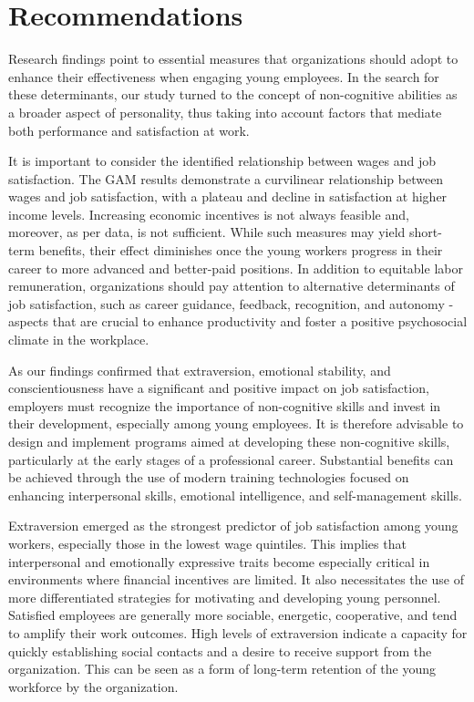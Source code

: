 \documentclass[
]{interact}
\begin{document}
\section{Recommendations}\label{recommendations}

Research findings point to essential measures that organizations should
adopt to enhance their effectiveness when engaging young employees. In
the search for these determinants, our study turned to the concept of
non-cognitive abilities as a broader aspect of personality, thus taking
into account factors that mediate both performance and satisfaction at
work.

It is important to consider the identified relationship between wages
and job satisfaction. The GAM results demonstrate a curvilinear
relationship between wages and job satisfaction, with a plateau and
decline in satisfaction at higher income levels. Increasing economic
incentives is not always feasible and, moreover, as per data, is not
sufficient. While such measures may yield short-term benefits, their
effect diminishes once the young workers progress in their career to
more advanced and better-paid positions. In addition to equitable labor
remuneration, organizations should pay attention to alternative
determinants of job satisfaction, such as career guidance, feedback,
recognition, and autonomy - aspects that are crucial to enhance
productivity and foster a positive psychosocial climate in the
workplace.

As our findings confirmed that extraversion, emotional stability, and
conscientiousness have a significant and positive impact on job
satisfaction, employers must recognize the importance of non-cognitive
skills and invest in their development, especially among young
employees. It is therefore advisable to design and implement programs
aimed at developing these non-cognitive skills, particularly at the
early stages of a professional career. Substantial benefits can be
achieved through the use of modern training technologies focused on
enhancing interpersonal skills, emotional intelligence, and
self-management skills.

Extraversion emerged as the strongest predictor of job satisfaction
among young workers, especially those in the lowest wage quintiles. This
implies that interpersonal and emotionally expressive traits become
especially critical in environments where financial incentives are
limited. It also necessitates the use of more differentiated strategies
for motivating and developing young personnel. Satisfied employees are
generally more sociable, energetic, cooperative, and tend to amplify
their work outcomes. High levels of extraversion indicate a capacity for
quickly establishing social contacts and a desire to receive support
from the organization. This can be seen as a form of long-term retention
of the young workforce by the organization.
\end{document}
